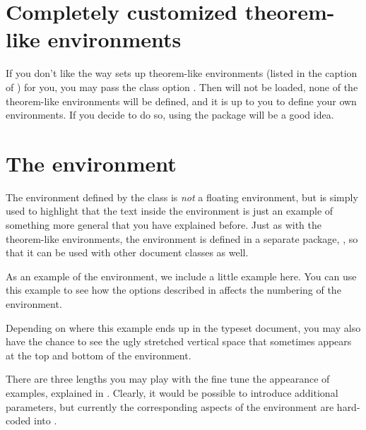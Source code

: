 \section{Completely customized theorem-like environments}\label{sec:rtthesis:custom-theorems}
%
If you don't like the way \rtthesis sets up theorem-like environments (listed in the caption of ) for you, you may pass the class option .  Then  will not be loaded, none of the theorem-like environments will be defined, and it is up to you to define your own environments.  If you decide to do so, using the  package will be a good idea.

\section{The  environment}
%
The  environment defined by the \rtthesis class is \emph{not} a floating environment, but is simply used to highlight that the text inside the environment is just an example of something more general that you have explained before.  Just as with the theorem-like environments, the environment is defined in a separate package, , so that it can be used with other document classes as well.

\begin{example}
  As an example of the  environment, we include a little example here.  You can use this example to see how the options described in  affects the numbering of the environment.

  Depending on where this example ends up in the typeset document, you may also have the chance to see the ugly stretched vertical space that sometimes appears at the top and bottom of the environment.
\end{example}

There are three lengths you may play with the fine tune the appearance of examples, explained in .  Clearly, it would be possible to introduce additional parameters, but currently the corresponding aspects of the environment are hard-coded into \rtthesis.

